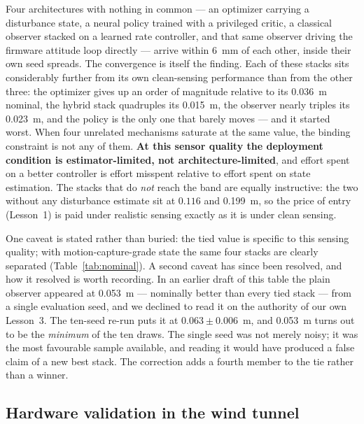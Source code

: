 \noindent Four architectures with nothing in common --- an optimizer carrying a
disturbance state, a neural policy trained with a privileged critic, a classical observer
stacked on a learned rate controller, and that same observer driving the firmware
attitude loop directly --- arrive within \SI{6}{\milli\meter} of each other, inside their
own seed spreads. The convergence is itself the finding. Each of these stacks sits
considerably further from its own clean-sensing performance than from the other three:
the optimizer gives up an order of magnitude relative to its \SI{0.036}{\meter} nominal,
the hybrid stack quadruples its \SI{0.015}{\meter}, the observer nearly triples its
\SI{0.023}{\meter}, and the policy is the only one that barely moves --- and it started
worst. When four unrelated mechanisms saturate at the same value, the binding constraint
is not any of them. \textbf{At this sensor quality the deployment condition is
estimator-limited, not architecture-limited}, and effort spent on a better controller is
effort misspent relative to effort spent on state estimation. The stacks that do
\emph{not} reach the band are equally instructive: the two without any disturbance
estimate sit at $0.116$ and \SI{0.199}{\meter}, so the price of entry (Lesson~1) is paid
under realistic sensing exactly as it is under clean sensing.

One caveat is stated rather than buried: the tied value is specific to this sensing
quality; with motion-capture-grade state the same four stacks are clearly separated
(Table~\ref{tab:nominal}). A second caveat has since been resolved, and how it resolved
is worth recording. In an earlier draft of this table the plain observer appeared at
\SI{0.053}{\meter} --- nominally better than every tied stack --- from a single
evaluation seed, and we declined to read it on the authority of our own Lesson~3. The
ten-seed re-run puts it at $0.063\pm0.006$~\si{\meter}, and \SI{0.053}{\meter} turns out
to be the \emph{minimum} of the ten draws. The single seed was not merely noisy; it was
the most favourable sample available, and reading it would have produced a false claim of
a new best stack. The correction adds a fourth member to the tie rather than a winner.

\subsection{Hardware validation in the wind tunnel}
\label{sec:results:hardware}


